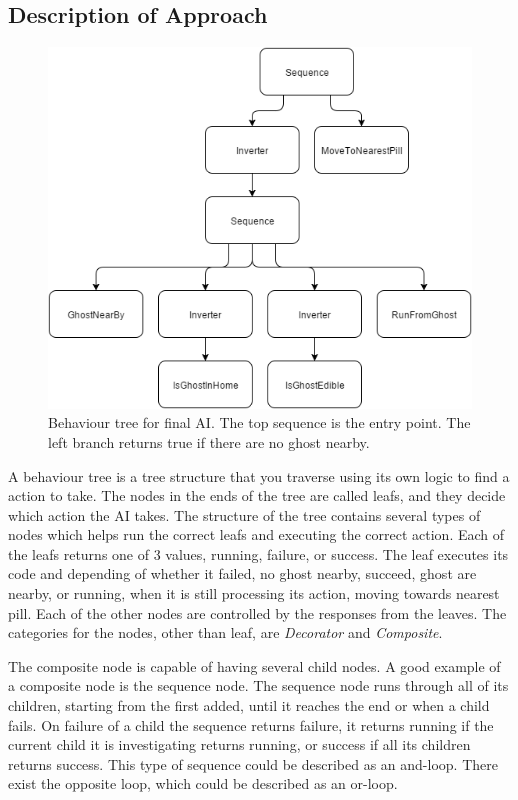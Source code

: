 \documentclass[conference,compsoc]{IEEEtran}
\begin{document}
\subsection{Description of Approach}
\begin{figure}[h]
	\graphicspath{{figures/}}
	\includegraphics[scale=0.5]{ModernAIBehaviourTree.png}
	\caption{Behaviour tree for final AI. The top sequence is the entry point. The left branch returns true if there are no ghost nearby.}
	\label{fig:behavTree}
\end{figure}
A behaviour tree is a tree structure that you traverse using its own logic to find a action to take. The nodes in the ends of the tree are called leafs, and they decide which action the AI takes. 
The structure of the tree contains several types of nodes which helps run the correct leafs and executing the correct action. 
Each of the leafs returns one of 3 values, running, failure, or success. The leaf executes its code and depending of whether it failed, no ghost nearby, succeed, ghost are nearby, or running, when it is still processing its action, moving towards nearest pill.
Each of the other nodes are controlled by the responses from the leaves. The categories for the nodes, other than leaf, are \textit{Decorator} and \textit{Composite}.

The composite node is capable of having several child nodes. A good example of a composite node is the sequence node. The sequence node runs through all of its children, starting from the first added, until it reaches the end or when a child fails. On failure of a child the sequence returns failure, it returns running if the current child it is investigating returns running, or success if all its children returns success. This type of sequence could be described as an and-loop. There exist the opposite loop, which could be described as an or-loop.
\end{document}
